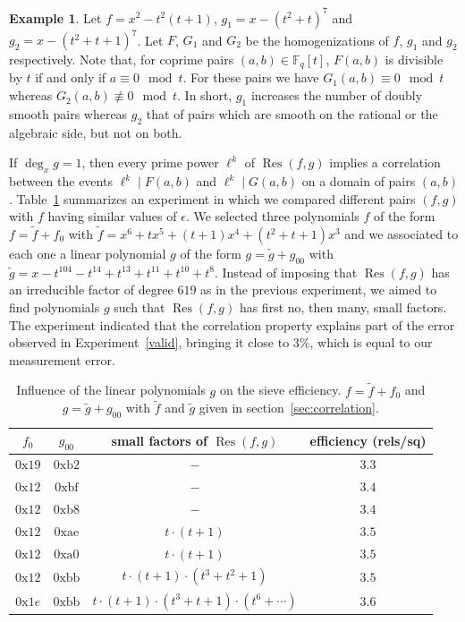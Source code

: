 \documentclass[a4wide]{article}
\newcommand{\F}{{\mathbb F}}
\DeclareMathOperator{\Res}{Res}
\theoremstyle{plain}
\theoremstyle{definition}
\newtheorem{ex}[theo]{Example}
\theoremstyle{remark}
\begin{document}
\begin{ex}\label{correlation} Let $f=x^2-t^2(t+1)$, $g_1=x-(t^2+t)^7$ and
$g_2=x-(t^2+t+1)^7$. Let $F$,
$G_1$ and $G_2$ be the homogenizations of $f$, $g_1$ and $g_2$
respectively. Note that, for coprime pairs $(a,b)\in \F_q[t]$, $F(a,b)$ is divisible
by $t$ if and only if $a\equiv 0\mod t$. For these pairs 
we have $G_1(a,b)\equiv 0\mod t$ whereas $G_2(a,b)\not\equiv 0\mod t$.
In short, $g_1$ increases the number of doubly smooth pairs whereas $g_2$
that of pairs which are smooth on the rational or the algebraic side, but not on both. 
\end{ex}
If $\deg_xg=1$, then every prime
power $\ell^k$ of $\Res(f,g)$ implies a correlation between the events
$\ell^k \mid F(a,b)$ and $\ell^k \mid G(a,b)$ on a domain of pairs $(a,b)$. 
 Table~\ref{fg} summarizes an
experiment in which we compared different pairs $(f,g)$ with $f$ having
similar values of $\epsilon$. We selected three polynomials $f$ of the form
$f=\tilde{f}+f_0$ with $\tilde{f}=x^6+tx^5+(t+1)x^4+(t^2+t+1)x^3$ and we
associated to each one a linear polynomial $g$ of the form
$g=\tilde{g}+g_{00}$ with $\tilde{g}=x-t^{104}-t^{14} + t^{13} + t^{11} +
t^{10} + t^8$. Instead of imposing that $\Res(f,g)$ has an irreducible factor of degree
$619$ as in the previous experiment, we aimed to find polynomials $g$ such
that $\Res(f,g)$ has first no, then many, small factors. The experiment
indicated that the correlation property explains part of the error observed
in Experiment~\ref{valid}, bringing it close to $3\%$, which is equal to our measurement error. 
\begin{table}
	\caption{Influence of the linear polynomials $g$ on the sieve
	efficiency. $f=\tilde{f}+f_0$ and $g=\tilde{g}+g_{00}$ with
	$\tilde{f}$ and $\tilde{g}$ given in section~\ref{sec:correlation}.}
	\begin{center}
\begin{tabular}{|c|c|c|c|}
\hline
$f_0$ & $g_{00}$ &small factors of $\Res(f,g)$&
efficiency (rels/sq)\\
\hline
$0\text{x}19$ & $0\text{xb2}$ & $-$            &$3.3$\\
$0\text{x}12$ & $0\text{xbf}$ & $-$            &$3.4$\\
$0\text{x}12$ & $0\text{xb8}$ & $-$            &$3.4$\\
\hline
$0\text{x}12$ & $0\text{xae}$ &$t\cdot (t+1)$          &$3.5$\\
$0\text{x}12$ & $0\text{xa0}$ &$t\cdot (t+1)$      &$3.5$\\
\hline
$0\text{x}12$ & $0\text{xbb}$ &$t\cdot (t+1)\cdot (t^3+t^2+1)$        &$3.5$\\
$0\text{x}1e$ & $0\text{xbb}$ &$t\cdot (t+1)\cdot(t^3+t+1)\cdot (t^6+\cdots)$     &$3.6$\\
\hline
\end{tabular}
\end{center}

\label{fg}
\end{table}
\end{document}
